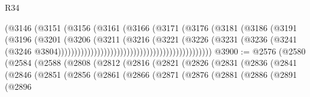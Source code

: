 \begin{lexlean}{R34}
\begin{coremodule}
                                                        (@3146
                                                          (@3151
                                                            (@3156
                                                              (@3161
                                                                (@3166
                                                                  (@3171
                                                                    (@3176
                                                                      (@3181
                                                                        (@3186
                                                                          (@3191
                                                                            (@3196
                                                                              (@3201
                                                                                (@3206
                                                                                  (@3211
                                                                                    (@3216
                                                                                      (@3221
                                                                                        (@3226
                                                                                          (@3231
                                                                                            (@3236
                                                                                              (@3241
                                                                                                (@3246
                                                                                                  @3804)))))))))))))))))))))))))))))))))))))))))))))))
@3900 := @2576
    (@2580
      (@2584
        (@2588
          (@2808
            (@2812
              (@2816
                (@2821
                  (@2826
                    (@2831
                      (@2836
                        (@2841
                          (@2846
                            (@2851
                              (@2856
                                (@2861
                                  (@2866
                                    (@2871
                                      (@2876
                                        (@2881
                                          (@2886
                                            (@2891
                                              (@2896

\end{coremodule}
\end{lexlean}
